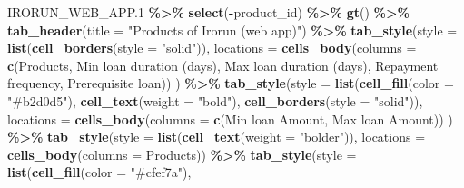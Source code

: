 \documentclass[
]{article}
\newenvironment{Shaded}{\begin{snugshade}}{\end{snugshade}}
\newcommand{\AttributeTok}[1]{\textcolor[rgb]{0.13,0.29,0.53}{#1}}
\newcommand{\FloatTok}[1]{\textcolor[rgb]{0.00,0.00,0.81}{#1}}
\newcommand{\FunctionTok}[1]{\textcolor[rgb]{0.13,0.29,0.53}{\textbf{#1}}}
\newcommand{\NormalTok}[1]{#1}
\newcommand{\SpecialCharTok}[1]{\textcolor[rgb]{0.81,0.36,0.00}{\textbf{#1}}}
\newcommand{\StringTok}[1]{\textcolor[rgb]{0.31,0.60,0.02}{#1}}
\begin{document}
\begin{Shaded}
\begin{Highlighting}[]
\NormalTok{IRORUN\_WEB\_APP}\FloatTok{.1} \SpecialCharTok{\%\textgreater{}\%}
  \FunctionTok{select}\NormalTok{(}\SpecialCharTok{{-}}\NormalTok{product\_id) }\SpecialCharTok{\%\textgreater{}\%} \FunctionTok{gt}\NormalTok{() }\SpecialCharTok{\%\textgreater{}\%} 
  \FunctionTok{tab\_header}\NormalTok{(}\AttributeTok{title =} \StringTok{"Products of Irorun (web app)"}\NormalTok{) }\SpecialCharTok{\%\textgreater{}\%} 
  \FunctionTok{tab\_style}\NormalTok{(}\AttributeTok{style =} \FunctionTok{list}\NormalTok{(}\FunctionTok{cell\_borders}\NormalTok{(}\AttributeTok{style =} \StringTok{"solid"}\NormalTok{)),}
            \AttributeTok{locations =} \FunctionTok{cells\_body}\NormalTok{(}\AttributeTok{columns =} \FunctionTok{c}\NormalTok{(Products, }\StringTok{\textasciigrave{}}\AttributeTok{Min loan duration (days)}\StringTok{\textasciigrave{}}\NormalTok{, }\StringTok{\textasciigrave{}}\AttributeTok{Max loan duration (days)}\StringTok{\textasciigrave{}}\NormalTok{, }\StringTok{\textasciigrave{}}\AttributeTok{Repayment frequency}\StringTok{\textasciigrave{}}\NormalTok{, }\StringTok{\textasciigrave{}}\AttributeTok{Prerequisite loan}\StringTok{\textasciigrave{}}\NormalTok{))}
\NormalTok{            ) }\SpecialCharTok{\%\textgreater{}\%} 
  \FunctionTok{tab\_style}\NormalTok{(}\AttributeTok{style =} \FunctionTok{list}\NormalTok{(}\FunctionTok{cell\_fill}\NormalTok{(}\AttributeTok{color =} \StringTok{"\#b2d0d5"}\NormalTok{), }
                         \FunctionTok{cell\_text}\NormalTok{(}\AttributeTok{weight =} \StringTok{"bold"}\NormalTok{), }\FunctionTok{cell\_borders}\NormalTok{(}\AttributeTok{style =} \StringTok{"solid"}\NormalTok{)),}
            \AttributeTok{locations =} \FunctionTok{cells\_body}\NormalTok{(}\AttributeTok{columns =} \FunctionTok{c}\NormalTok{(}\StringTok{\textasciigrave{}}\AttributeTok{Min loan Amount}\StringTok{\textasciigrave{}}\NormalTok{, }\StringTok{\textasciigrave{}}\AttributeTok{Max loan Amount}\StringTok{\textasciigrave{}}\NormalTok{))}
\NormalTok{            ) }\SpecialCharTok{\%\textgreater{}\%} 
  \FunctionTok{tab\_style}\NormalTok{(}\AttributeTok{style =} \FunctionTok{list}\NormalTok{(}\FunctionTok{cell\_text}\NormalTok{(}\AttributeTok{weight =} \StringTok{"bolder"}\NormalTok{)),}
            \AttributeTok{locations =} \FunctionTok{cells\_body}\NormalTok{(}\AttributeTok{columns =}\NormalTok{ Products)) }\SpecialCharTok{\%\textgreater{}\%} 
  \FunctionTok{tab\_style}\NormalTok{(}\AttributeTok{style =} \FunctionTok{list}\NormalTok{(}\FunctionTok{cell\_fill}\NormalTok{(}\AttributeTok{color =} \StringTok{"\#cfef7a"}\NormalTok{),}

\end{Highlighting}
\end{Shaded}
\end{document}
